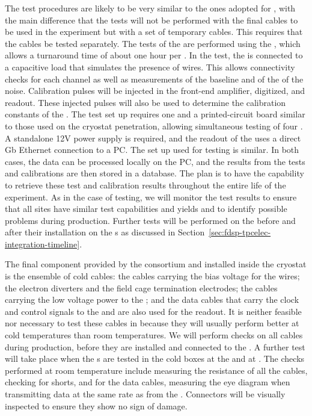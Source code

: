 The test procedures are likely to be
very similar to the ones adopted for , with the main
difference that the tests will not be performed with
the final cables to be used in the experiment but 
with a set of temporary cables. This requires that the 
cables be tested separately. The tests of the 
are performed using the , which allows a turnaround
time of about one hour per . In the
test, the  is connected to a capacitive load that
simulates the presence of  wires. This allows
connectivity checks for each channel as well as measurements of
the baseline and of the \rms of the noise. Calibration 
pulses will be injected in the front-end amplifier, digitized,
and readout. These injected pulses will also be used
to determine the calibration constants of the . 
The test set up requires one  and
a printed-circuit board similar to those used on the cryostat
penetration, allowing simultaneous testing of four .
A standalone 12V power supply is required, and the readout
of the  uses a direct Gb Ethernet connection to
a PC. The set up used for  testing is similar.
In both cases, the data can be processed locally on the PC,
and the results from the tests and calibrations are then stored 
in a database. The plan is to have the capability to retrieve  
these test and calibration results throughout the entire life
of the experiment. As in the case of  testing,
we will monitor the test results to ensure that all
sites have similar test capabilities and yields and to
identify possible problems during production.
Further tests will be performed on the 
before and after their installation on the s as
discussed in Section~\ref{sec:fdsp-tpcelec-integration-timeline}.

The final component provided by the  consortium
and installed inside the cryostat is the ensemble of cold
cables: the cables carrying the bias voltage for the 
wires; the electron diverters and the field cage termination electrodes;
the cables carrying the low voltage power to the ;
and the data cables that carry the clock and control signals
to the  and are also used for the readout. It is neither
feasible nor necessary to test these cables in \lntwo
because they will usually perform better at cold temperatures than 
room temperatures. We will perform checks on all cables 
during production, before they are installed and 
connected to the . A further test will take place
when the s are tested in the cold boxes at the 
and at . The checks performed at room temperature include
measuring the resistance of all the cables, checking for
shorts, and for the data cables, measuring the
eye diagram when transmitting data at the same rate as from the
. Connectors will be visually inspected 
to ensure they show no sign of damage.

